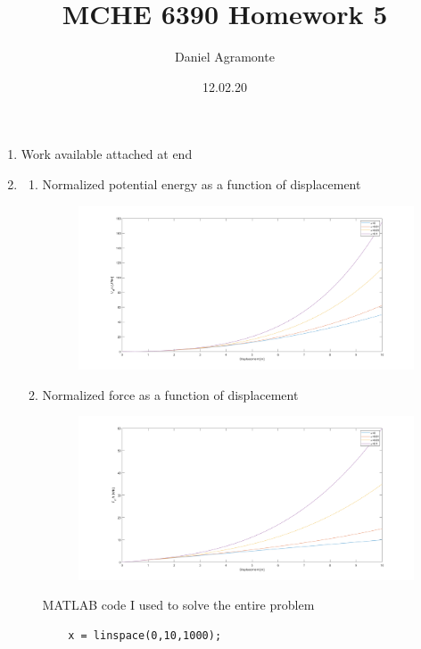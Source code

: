 \documentclass{article}
\title{\Huge MCHE 6390 Homework 5} \author{Daniel Agramonte} \date{12.02.20}
\begin{document}
\maketitle

\begin{enumerate}
    \item 
    Work available attached at end
    \item 
    \begin{enumerate}
        \item 
        Normalized potential energy as a function of displacement
            \begin{figure}[H]
            \vspace{-10pt}
            \includegraphics[width=\textwidth,left]{MCHE 6390/HW05/Figures/Figure_1_MCHE_6930_HW05.png}
            \label{fig:2a}
            \end{figure}
        \newpage
        \item
        Normalized force as a function of displacement
        \newline
            \begin{figure}[H]
            \vspace{-10pt}
            \includegraphics[width=\textwidth,left]{MCHE 6390/HW05/Figures/Figure_2_MCHE_6930_HW05.png}
            \label{fig:2b}
            \end{figure}
    MATLAB code I used to solve the entire problem
    \begin{lstlisting}[style=Matlab-editor]
    % Define delta x from 0 to 10
    x = linspace(0,10,1000);
    

\end{lstlisting}
\end{enumerate}
\end{enumerate}
\end{document}
